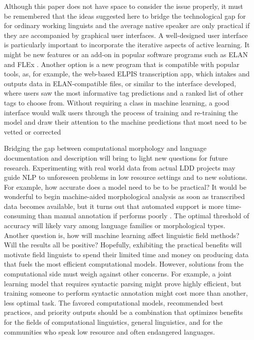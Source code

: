 \documentclass[12pt]{article}
\begin{document}
Although this paper does not have space to consider the issue properly, it must be remembered that the ideas suggested here to bridge the technological gap for for ordinary working linguists and the average native speaker are only practical if they are accompanied by graphical user interfaces. A well-designed user interface is particularly important to incorporate the iterative aspects of active learning. It might be new features or an add-on in popular software programs such as ELAN \cite{auer_elan_2010} and FLEx \cite{Black06FLEX}.  Another option is a new program that is compatible with popular tools, as, for example, the web-based ELPIS \cite{foley_elpis_2018} transcription app, which intakes and outputs data in ELAN-compatible files, or similar to the interface  developed, where users saw the most informative tag predictions and a ranked list of other tags to choose from. Without requiring a class in machine learning, a good interface would walk users through the process of training and re-training the model and draw their attention to the machine predictions that most need to be vetted or corrected

Bridging the gap between computational morphology and language documentation and description will bring to light new questions for future research. Experimenting with real world data from actual LDD projects may guide NLP to unforeseen problems in low resource settings and to new solutions. For example, how accurate does a model need to be to be practical? It would be wonderful to begin machine-aided morphological analysis as soon as transcribed data becomes available, but it turns out that automated support is more time-consuming than manual annotation if performs poorly \cite{kothur_document-level_2018,palmer_semi-automated_2009}. The optimal threshold of accuracy will likely vary among language families or morphological types. Another question is, how will machine learning affect linguistic field methods? Will the results all be positive? Hopefully, exhibiting the practical benefits will motivate field linguists to spend their limited time and money on producing data that fuels the most efficient computational models. However, solutions from the computational side must weigh against other concerns. For example, a joint learning model that requires syntactic parsing might prove highly efficient, but training someone to perform syntactic annotation might cost more than another, less optimal task. The favored computational models, recommended best practices, and priority outputs should be a combination that optimizes benefits for the fields of computational linguistics, general linguistics, and for the communities who speak low resource and often endangered languages. 
\end{document}
